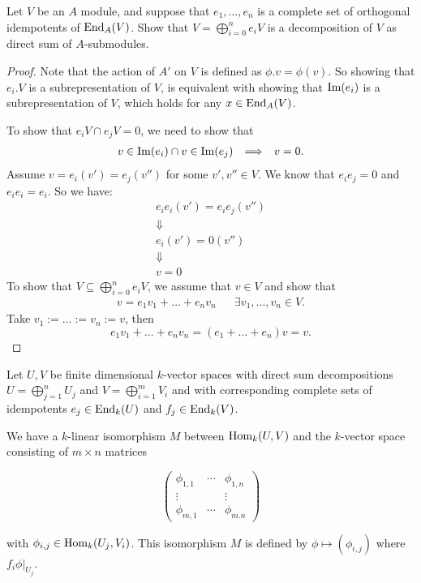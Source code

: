 \begin{prop}
Let \(V\) be an \(A\) module, and suppose that \(e_{1},\ldots ,e_{n}\) is a complete set of orthogonal idempotents of \(\operatorname{End}_A(V)\). Show that \(V=\bigoplus_{i=0}^ne_{i}V\) is a decomposition of \(V\) as direct sum of \(A\)-submodules.
\end{prop}

\begin{proof}
Note that the action of \(A'\) on \(V\) is defined as \(\phi .v=\phi (v)\). So showing that \(e_{i}.V\) is a subrepresentation of \(V\), is equivalent with showing that \(\operatorname{Im}(e_{i})\) is a subrepresentation of \(V\), which holds for any \(x\in \operatorname{End}_A(V)\).

To show that \(e_{i}V\cap e_{j}V=0\), we need to show that
\begin{align*}
v\in \operatorname{Im}(e_{i})\cap v\in \operatorname{Im}(e_{j}) &&\Longrightarrow &&v=0.
\end{align*}
Assume \(v=e_{i}(v')=e_{j}(v'')\) for some \(v',v''\in V\). We know that \(e_{i}e_{j}=0\) and \(e_{i}e_{i}=e_{i}\). So we have:
\begin{gather*}
e_{i}e_{i}(v')=e_{i}e_{j}(v'') \\
\Downarrow  \\
e_{i}(v')=0(v'') \\
\Downarrow  \\
v=0
\end{gather*}
To show that \(V\subseteq \bigoplus_{i=0}^ne_{i}V\), we assume that \(v\in V\) and show that
\begin{align*}
v=e_{1}v_{1}+\ldots +e_{n}v_{n} &&\exists v_{1},\ldots ,v_{n}\in V.
\end{align*}
Take \(v_{1}:=\ldots :=v_{n}:=v\), then
\[
e_{1}v_{1}+\ldots +e_{n}v_{n}= (e_{1}+\ldots +e_{n})v=v.
\]
\end{proof}


\begin{prop}
Let \(U,V\) be finite dimensional \(k\)-vector spaces with direct sum decompositions \(U=\bigoplus_{j=1}^nU_{j}\) and \(V=\bigoplus_{i=1}^mV_{i}\) and with corresponding complete sets of idempotents \(e_{j}\in \operatorname{End}_{k}(U)\) and \(f_{j}\in \operatorname{End}_{k}(V)\).

We have a \(k\)-linear isomorphism \(M\) between \(\operatorname{Hom}_{k}(U,V)\) and the \(k\)-vector space consisting of \(m\times n\) matrices

\[\begin{pmatrix}\phi _{1,1} &\cdots &\phi _{1,n} \\
\vdots  & & \vdots  \\
\phi _{m,1} &\cdots &\phi _{m.n} \end{pmatrix}\]

with \(\phi _{i,j}\in \operatorname{Hom}_{k}(U_{j},V_{i})\). This isomorphism \(M\) is defined by \(\phi  \mapsto  (\phi _{i,j})\) where \(f_{i}\phi |_{U_{j}}\).
\end{prop}

